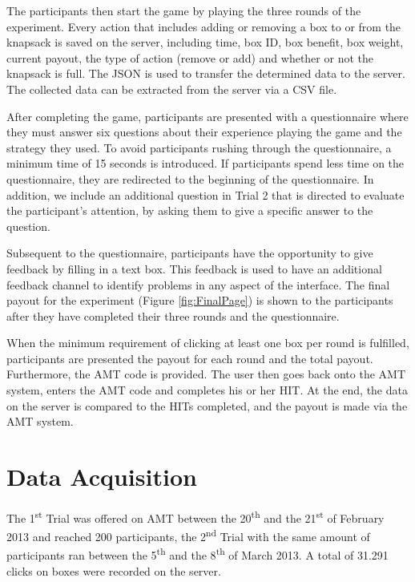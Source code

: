 The participants then start the game by playing the three rounds of the experiment. Every action that includes adding or removing a box to or from the knapsack is saved on the server, including time, box ID, box benefit, box weight, current payout, the type of action (remove or add) and whether or not the knapsack is full.
The \ac{JSON} is used to transfer the determined data to the server. The collected data can be extracted from the server via a \ac{CSV} file.

After completing the game, participants are presented with a questionnaire where they must answer six questions about their experience playing the game and the strategy they used. To avoid participants rushing through the questionnaire, a minimum time of 15 seconds is introduced. If participants spend less time on the questionnaire, they are redirected to the beginning of the questionnaire. In addition, we include an additional question in Trial 2 that is directed to evaluate the participant's attention, by asking them to give a specific answer to the question.

Subsequent to the questionnaire, participants have the opportunity to give feedback by filling in a text box. This feedback is used to have an additional feedback channel to identify problems in any aspect of the interface. The final payout for the experiment (Figure \ref{fig:FinalPage}) is shown to the participants after they have completed their three rounds and the questionnaire.

When the minimum requirement of clicking at least one box per round is fulfilled, participants are presented the payout for each round and the total payout. Furthermore, the \ac{AMT} code is provided. The user then goes back onto the \ac{AMT} system, enters the \ac{AMT} code and completes his or her \ac{HIT}. At the end, the data on the server is compared to the \ac{HIT}s completed, and the payout is made via the \ac{AMT} system.

\section{Data Acquisition}
\label{ch:Experiment:sec:DataacquisitionDescriptives}
The 1\textsuperscript{st} Trial was offered on \ac{AMT} between the 20\textsuperscript{th} and the 21\textsuperscript{st} of February 2013 and reached 200 participants, the 2\textsuperscript{nd} Trial with the same amount of participants ran between the 5\textsuperscript{th} and the 8\textsuperscript{th} of March 2013. A total of 31.291 clicks on boxes were recorded on the server.


